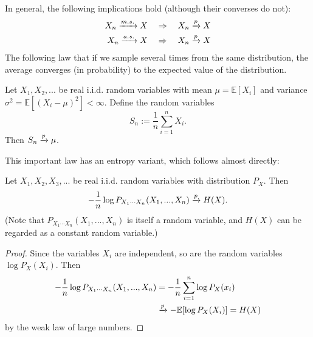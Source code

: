 In general, the following implications hold (although their converses do not):
\begin{align}
X_n \xrightarrow{m.s.} X \ \ \ &\Rightarrow\ \ \  X_n \xrightarrow{p} X\\
X_n \xrightarrow{a.s.} X \ \ \ &\Rightarrow\ \ \  X_n \xrightarrow{p} X
\end{align}
The following law that if we sample several times from the same distribution, the average converges (in probability) to the expected value of the distribution.
\begin{theorem}
Let $X_1, X_2, ...$ be real i.i.d. random variables with mean $\mu = \mathbb{E}[X_i]$ and variance $\sigma^2 = \mathbb{E}[(X_i - \mu)^2] < \infty$. Define the random variables
\[
S_n := \frac{1}{n} \sum_{i=1}^n X_i.
\]
Then $S_n \xrightarrow{p} \mu$.
\end{theorem}
This important law has an entropy variant, which follows almost directly:
\begin{theorem}
Let $X_1, X_2, X_3, ...$ be real i.i.d. random variables with distribution $P_X$. Then
\[
-\frac{1}{n} \log P_{X_1 \cdots X_n}(X_1, ..., X_n) \xrightarrow{p} H(X).
\]
(Note that $P_{X_1 \cdots X_n}(X_1, ..., X_n)$ is itself a random variable, and $H(X)$ can be regarded as a constant random variable.)
\end{theorem}
\begin{proof}
Since the variables $X_i$ are independent, so are the random variables $\log P_X(X_i)$. Then
\begin{align}
-\frac{1}{n} \log P_{X_1\cdots X_n}(X_1, ..., X_n) &= -\frac{1}{n} \sum_{i=1}^n \log P_X(x_i)\nonumber\\
&\xrightarrow{p} - \mathbb{E}[\log P_X(X_i)] = H(X)
\end{align}
by the weak law of large numbers.
\end{proof}

